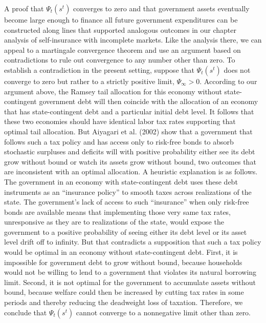 A proof that $\Psi_t(s^t)$  converges to zero and that government
assets eventually  become large enough to finance all future government
expenditures %
 can be  constructed along
lines that supported analogous outcomes in our chapter
 analysis of  self-insurance with incomplete markets.
Like the analysis there, we can  appeal to a martingale convergence theorem
and use an argument based on contradictions to rule out
convergence to any number other than zero. To establish a
contradiction in the present setting, suppose that $\Psi_t(s^t)$
does not converge to zero but rather to a strictly positive limit,
$\Psi_\infty > 0$. According to our argument above, the Ramsey
tail allocation for this economy without state-contingent
government debt will then coincide with the allocation of an
economy that has state-contingent debt and a particular initial
debt level. It follows that these two economies should have
identical labor tax rates supporting that optimal tail allocation.
But Aiyagari et al. (2002) show that a government that follows
such a tax policy and has access only to risk-free bonds to absorb
stochastic surpluses and deficits will with positive probability
 either see its debt grow without bound or watch its assets grow without
bound, two outcomes that are  inconsistent with an optimal
allocation. A heuristic explanation is as follows. The
government in an economy with state-contingent debt uses these
debt instruments as an ``insurance policy'' to smooth taxes
across realizations of the state. The government's lack of access to  such 
``insurance'' when only risk-free bonds are available
means that implementing those very same tax rates, unresponsive as
they are to realizations of the state, would  expose the
government to a positive probability of seeing either its debt
level or its asset level drift off to infinity. But that
contradicts a supposition that such a tax policy would be optimal
in an economy without state-contingent debt. First, it is
impossible for government debt to grow without bound, because
households would not be willing to lend to a government that
violates its natural borrowing limit. Second, it is not optimal
for the government to accumulate assets without bound, because
welfare could then be increased by cutting tax rates in some
periods and thereby reducing the deadweight loss of
taxation. Therefore, we conclude
that $\Psi_t(s^t)$ cannot converge to a nonnegative limit other
than zero.

